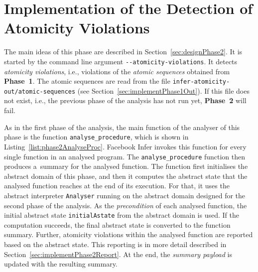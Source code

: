 \begin{algorithm}[hbt]



    \caption{%
        Printing atomic sequences from the summaries of all analysed 
        functions
    }
    \label{alg:printAtomSeq}
\end{algorithm}


\section{Implementation of the Detection of Atomicity Violations}
\label{sec:implementPhase2}

The main ideas of this phase are described in Section~\ref{sec:designPhase2}.
It is started by the command line argument \texttt{{-}{-}atomicity-violations}.
It detects \emph{atomicity violations}, i.e., violations of the \emph{atomic
sequences} obtained from \textbf{Phase~1}. The atomic sequences are read from
the file \texttt{infer-atomicity-out/atomic-sequences} (see
Section~\ref{sec:implementPhase1Out}). If this file does not exist,
i.e., the previous phase of the analysis has not run yet, \textbf{Phase~2} 
will fail.

As in the first phase of the analysis, the main function of the analyser 
of this phase is the function \texttt{analyse\_procedure}, which is shown
in Listing~\ref{list:phase2AnalyseProc}. Facebook Infer invokes this
function for every single function in an analysed program. The 
\texttt{analyse\_procedure} function then produces a~summary for the 
analysed function. The function first initialises the abstract domain of 
this phase, and then it computes the abstract state that the analysed 
function reaches at the end of its execution. For that, it uses the 
abstract interpreter \texttt{Analyser} running on the abstract domain 
designed for the second phase of the analysis. As the \emph{precondition} 
of each analysed function, the initial abstract state \texttt{initialAstate}
from the abstract domain is used. If the computation succeeds, the final
abstract state is converted to the function summary. Further, atomicity
violations within the analysed function are reported based on the abstract
state. This reporting is in more detail described in
Section~\ref{sec:implementPhase2Report}. At the end, the \emph{summary 
payload} is updated with the resulting summary.

